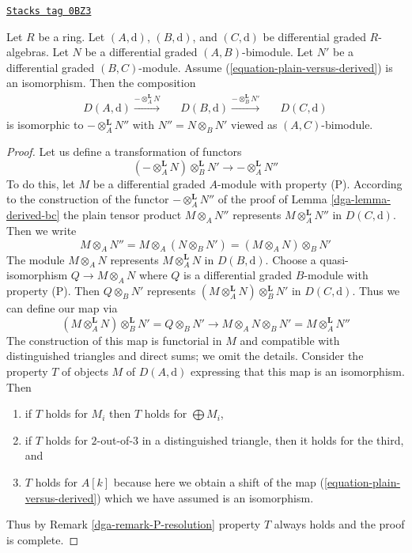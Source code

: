 \begin{lemma}
\label{dga-lemma-compose-tensor-functors-general}
\href{https://stacks.math.columbia.edu/tag/0BZ3}{\texttt{Stacks tag 0BZ3}}

Let $R$ be a ring. Let $(A, \text{d})$, $(B, \text{d})$, and
$(C, \text{d})$ be differential graded $R$-algebras.
Let $N$ be a differential graded $(A, B)$-bimodule.
Let $N'$ be a differential graded $(B, C)$-module.
Assume (\ref{equation-plain-versus-derived}) is an isomorphism.
Then the composition
$$
\begin{array}{ccccc}D(A, \text{d}) \overset{- \otimes_A^\mathbf{L} N}{\longrightarrow} &  & D(B, \text{d}) \overset{- \otimes_B^\mathbf{L} N'}{\longrightarrow} &  & D(C, \text{d})\end{array}
$$
is isomorphic to $- \otimes_A^\mathbf{L} N''$ with
$N'' = N \otimes_B N'$ viewed as $(A, C)$-bimodule.
\end{lemma}

\begin{proof}

Let us define a transformation of functors
$$
(- \otimes_A^\mathbf{L} N) \otimes_B^\mathbf{L} N'
\longrightarrow
- \otimes_A^\mathbf{L} N''
$$
To do this, let
$M$ be a differential graded $A$-module with property (P).
According to the construction of the functor $- \otimes_A^\mathbf{L} N''$
of the proof of Lemma \ref{dga-lemma-derived-bc} the plain tensor
product $M \otimes_A N''$ represents $M \otimes_A^\mathbf{L} N''$
in $D(C, \text{d})$. Then we write
$$
M \otimes_A N'' =
M \otimes_A (N \otimes_B N') =
(M \otimes_A N) \otimes_B N'
$$
The module $M \otimes_A N$ represents $M \otimes_A^\mathbf{L} N$
in $D(B, \text{d})$. Choose a quasi-isomorphism $Q \to M \otimes_A N$
where $Q$ is a differential graded $B$-module with property (P). Then
$Q \otimes_B N'$ represents
$(M \otimes_A^\mathbf{L} N) \otimes_B^\mathbf{L} N'$ in
$D(C, \text{d})$.
Thus we can define our map via
$$
(M \otimes_A^\mathbf{L} N) \otimes_B^\mathbf{L} N' =
Q \otimes_B N' \to
M \otimes_A N \otimes_B N' =
M \otimes_A^\mathbf{L} N''
$$
The construction of this map is functorial in $M$ and compatible
with distinguished triangles and direct sums; we omit the details.
Consider the property $T$ of objects $M$ of $D(A, \text{d})$
expressing that this map is an isomorphism. Then
\begin{enumerate}
\item if $T$ holds for $M_i$ then $T$ holds for $\bigoplus M_i$,
\item if $T$ holds for $2$-out-of-$3$ in a distinguished
triangle, then it holds for the third, and
\item $T$ holds for $A[k]$ because here we obtain a shift
of the map (\ref{equation-plain-versus-derived}) which we
have assumed is an isomorphism.
\end{enumerate}
Thus by Remark \ref{dga-remark-P-resolution} property $T$
always holds and the proof is complete.
\end{proof}

